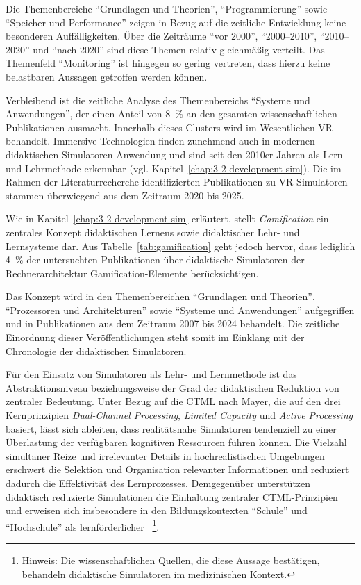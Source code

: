 Die Themenbereiche \enquote{Grundlagen und Theorien}, \enquote{Programmierung} sowie \enquote{Speicher und Performance} zeigen in Bezug auf die zeitliche Entwicklung keine besonderen Auffälligkeiten. Über die Zeiträume \enquote{vor 2000}, \enquote{2000--2010}, \enquote{2010--2020} und \enquote{nach 2020} sind diese Themen relativ gleichmäßig verteilt. Das Themenfeld \enquote{Monitoring} ist hingegen so gering vertreten, dass hierzu keine belastbaren Aussagen getroffen werden können.

Verbleibend ist die zeitliche Analyse des Themenbereichs \enquote{Systeme und Anwendungen}, der einen Anteil von 8~\% an den gesamten wissenschaftlichen Publikationen ausmacht. Innerhalb dieses Clusters wird im Wesentlichen \ac{VR} behandelt. Immersive Technologien finden zunehmend auch in modernen didaktischen Simulatoren Anwendung und sind seit den 2010er-Jahren als Lern- und Lehrmethode erkennbar (vgl. Kapitel~\ref{chap:3-2-development-sim}). Die im Rahmen der Literaturrecherche identifizierten Publikationen zu \ac{VR}-Simulatoren stammen überwiegend aus dem Zeitraum 2020 bis 2025.

Wie in Kapitel~\ref{chap:3-2-development-sim} erläutert, stellt \textit{Gamification} ein zentrales Konzept didaktischen Lernens sowie didaktischer Lehr- und Lernsysteme dar. Aus Tabelle~\ref{tab:gamification} geht jedoch hervor, dass lediglich 4~\% der untersuchten Publikationen über didaktische Simulatoren der Rechnerarchitektur Gamification-Elemente berücksichtigen.

Das Konzept wird in den Themenbereichen \enquote{Grundlagen und Theorien}, \enquote{Prozessoren und Architekturen} sowie \enquote{Systeme und Anwendungen} aufgegriffen und in Publikationen aus dem Zeitraum 2007 bis 2024 behandelt. Die zeitliche Einordnung dieser Veröffentlichungen steht somit im Einklang mit der Chronologie der didaktischen Simulatoren.

Für den Einsatz von Simulatoren als Lehr- und Lernmethode ist das Abstraktionsniveau beziehungsweise der Grad der didaktischen Reduktion von zentraler Bedeutung. Unter Bezug auf die \ac{CTML} nach Mayer, die auf den drei Kernprinzipien \textit{Dual-Channel Processing}, \textit{Limited Capacity} und \textit{Active Processing} basiert, lässt sich ableiten, dass realitätsnahe Simulatoren tendenziell zu einer Überlastung der verfügbaren kognitiven Ressourcen führen können. Die Vielzahl simultaner Reize und irrelevanter Details in hochrealistischen Umgebungen erschwert die Selektion und Organisation relevanter Informationen und reduziert dadurch die Effektivität des Lernprozesses. Demgegenüber unterstützen didaktisch reduzierte Simulationen die Einhaltung zentraler \ac{CTML}-Prinzipien und erweisen sich insbesondere in den Bildungskontexten \enquote{Schule} und \enquote{Hochschule} als lernförderlicher \parencites[S.~169]{tremblay_task_2023}[S.~955]{haji_thrive_2016}[S.~360]{reedy_using_2015}~\footnote{Hinweis: Die wissenschaftlichen Quellen, die diese Aussage bestätigen, behandeln didaktische Simulatoren im medizinischen Kontext.}.


